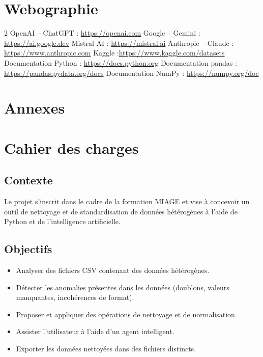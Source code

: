 \documentclass[a4paper, 12pt, twoside]{article}
\begin{document}
\section{Webographie}
\begin{thebibliography}{2}
     OpenAI – ChatGPT : \url{https://openai.com}
     Google – Gemini : \url{https://ai.google.dev}
     Mistral AI : \url{https://mistral.ai}
     Anthropic – Claude : \url{https://www.anthropic.com}
     Kaggle :\url{https://www.kaggle.com/datasets}
     Documentation Python : \url{https://docs.python.org}
     Documentation pandas : \url{https://pandas.pydata.org/docs}
     Documentation NumPy : \url{https://numpy.org/doc}
\end{thebibliography}

\newpage
\section{Annexes}
\appendix
\makeatletter
\def\@seccntformat#1{Annexe~\csname the#1\endcsname:\quad}
\makeatother
	\section{Cahier des charges}
\subsection*{Contexte}
Le projet s’inscrit dans le cadre de la formation MIAGE et vise à concevoir un outil de nettoyage et de standardisation de données hétérogènes à l’aide de Python et de l'intelligence artificielle.

\subsection*{Objectifs}
\begin{itemize}
    \item Analyser des fichiers CSV contenant des données hétérogènes.
    \item Détecter les anomalies présentes dans les données (doublons, valeurs manquantes, incohérences de format).
    \item Proposer et appliquer des opérations de nettoyage et de normalisation.
    \item Assister l’utilisateur à l’aide d’un agent intelligent.
    \item Exporter les données nettoyées dans des fichiers distincts.
\end{itemize}
\end{document}
